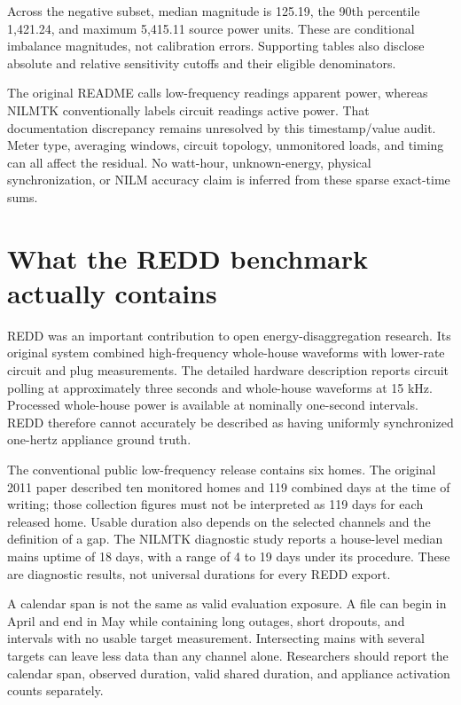 \documentclass[11pt,letterpaper]{article}
\begin{document}
Across the negative subset, median magnitude is 125.19, the 90th percentile 1,421.24, and maximum 5,415.11 source power units. These are conditional imbalance magnitudes, not calibration errors. Supporting tables also disclose absolute and relative sensitivity cutoffs and their eligible denominators.

The original README calls low-frequency readings apparent power, whereas NILMTK conventionally labels circuit readings active power. That documentation discrepancy remains unresolved by this timestamp/value audit. Meter type, averaging windows, circuit topology, unmonitored loads, and timing can all affect the residual. No watt-hour, unknown-energy, physical synchronization, or NILM accuracy claim is inferred from these sparse exact-time sums.

\section{What the REDD benchmark actually contains}
REDD was an important contribution to open energy-disaggregation research. Its original system combined high-frequency whole-house waveforms with lower-rate circuit and plug measurements. The detailed hardware description reports circuit polling at approximately three seconds and whole-house waveforms at 15 kHz. Processed whole-house power is available at nominally one-second intervals. REDD therefore cannot accurately be described as having uniformly synchronized one-hertz appliance ground truth. \cite{ref1,ref2}

The conventional public low-frequency release contains six homes. The original 2011 paper described ten monitored homes and 119 combined days at the time of writing; those collection figures must not be interpreted as 119 days for each released home. Usable duration also depends on the selected channels and the definition of a gap. The NILMTK diagnostic study reports a house-level median mains uptime of 18 days, with a range of 4 to 19 days under its procedure. These are diagnostic results, not universal durations for every REDD export. \cite{ref1,ref2}

A calendar span is not the same as valid evaluation exposure. A file can begin in April and end in May while containing long outages, short dropouts, and intervals with no usable target measurement. Intersecting mains with several targets can leave less data than any channel alone. Researchers should report the calendar span, observed duration, valid shared duration, and appliance activation counts separately.
\end{document}
